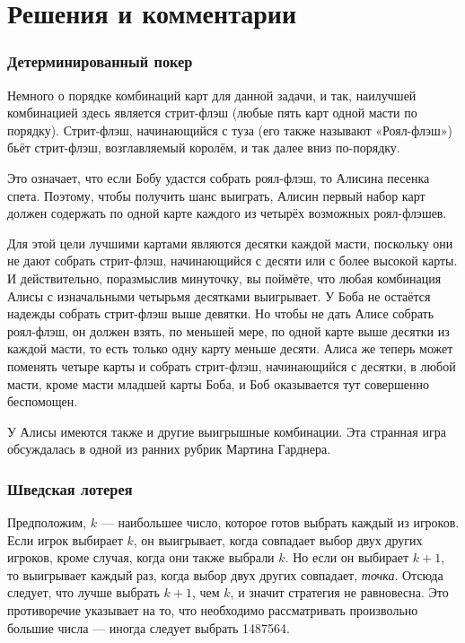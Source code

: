 \section*{Решения и комментарии}

\subsubsection*{Детерминированный покер}%

Немного о порядке комбинаций карт для данной задачи, и так, наилучшей комбинацией здесь является стрит-флэш (любые пять карт одной масти по порядку).
Стрит-флэш, начинающийся с туза (его также называют «Роял-флэш») бьёт стрит-флэш, возглавляемый королём, и так далее вниз по-порядку.

Это означает, что если Бобу удастся собрать роял-флэш, то Алисина песенка спета.
Поэтому, чтобы получить шанс выиграть, Алисин первый набор карт должен содержать по одной карте каждого из четырёх возможных роял-флэшев.

Для этой цели лучшими картами являются десятки каждой масти, поскольку они не дают собрать стрит-флэш, начинающийся с десяти или с более высокой карты.
И действительно, поразмыслив минуточку, вы поймёте, что любая комбинация Алисы с изначальными четырьмя десятками выигрывает.
У Боба не остаётся надежды собрать стрит-флэш выше девятки.
Но чтобы не дать Алисе собрать роял-флэш, он должен взять, по меньшей мере, по одной карте выше десятки из каждой масти, то есть только одну карту меньше десяти.
Алиса же теперь может поменять четыре карты и собрать стрит-флэш, начинающийся с десятки, в любой масти, кроме масти младшей карты Боба,
и Боб оказывается тут совершенно беспомощен.
\heart

У Алисы имеются также и другие выигрышные комбинации.
Эта странная игра обсуждалась в одной из ранних рубрик Мартина Гарднера. 

\subsubsection*{Шведская лотерея}%

Предположим, $k$ --- наибольшее число, которое готов выбрать каждый из игроков.
Если игрок выбирает $k$, он выигрывает, когда совпадает выбор двух других игроков, кроме случая, когда они также выбрали $k$.
Но если он выбирает $k+1$, то выигрывает каждый раз, когда выбор двух других совпадает, \emph{точка}.
Отсюда следует, что лучше выбрать $k+1$, чем $k$, и значит стратегия не равновесна.
Это противоречие указывает на то, что необходимо рассматривать произвольно большие числа --- иногда следует выбрать 1487564.
\heart

